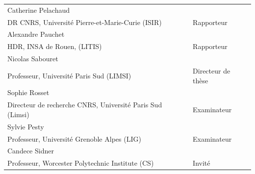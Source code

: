 \documentclass[a4paper]{article}
\newcommand{\jurynameA}{Catherine Pelachaud}
\newcommand{\juryadressA}{DR CNRS, Université Pierre-et-Marie-Curie (ISIR)}
\newcommand{\juryroleA}{Rapporteur}
\newcommand{\jurynameB}{Alexandre Pauchet}
\newcommand{\juryadressB}{HDR, INSA de Rouen, (LITIS)}
\newcommand{\juryroleB}{Rapporteur}
\newcommand{\jurynameD}{Sophie Rosset }
\newcommand{\juryadressD}{Directeur de recherche CNRS, Université Paris Sud (Limsi)}
\newcommand{\juryroleD}{Examinateur}
\newcommand{\jurynameE}{Nicolas Sabouret}
\newcommand{\juryadressE}{Professeur, Université Paris Sud (LIMSI)}
\newcommand{\juryroleE}{Directeur de thèse}
\newcommand{\jurynameF}{Sylvie Pesty}
\newcommand{\juryadressF}{Professeur, Université Grenoble Alpes (LIG)}
\newcommand{\juryroleF}{Examinateur}
\newcommand{\jurynameG}{Charles Rich}
\newcommand{\juryadressG}{Professeur, Worcester Polytechnic Institute (CS)}
\newcommand{\juryroleG}{Encadrant de thèse}
\newcommand{\jurynameH}{Candece Sidner}
\newcommand{\juryadressH}{Professeur, Worcester Polytechnic Institute (CS)}
\newcommand{\juryroleH}{Invité}
\begin{document}
\begin{textblock}{10.3}
		\label{jury} 																				%
		\begin{flushleft}
			\begin{tabular}{@{} L{10cm} R{4cm}}
				\jurynameA  \\ \juryadressA & \juryroleA \\
				\jurynameB  \\ \juryadressB & \juryroleB \\
				\jurynameE  \\ \juryadressE & \juryroleE \\
				\jurynameD  \\ \juryadressD & \juryroleD \\
				\jurynameF  \\ \juryadressF & \juryroleF \\
				\jurynameH  \\ \juryadressH & \juryroleH \\
			\end{tabular} 
		\end{flushleft}   
	\end{textblock}
	
\end{document}
